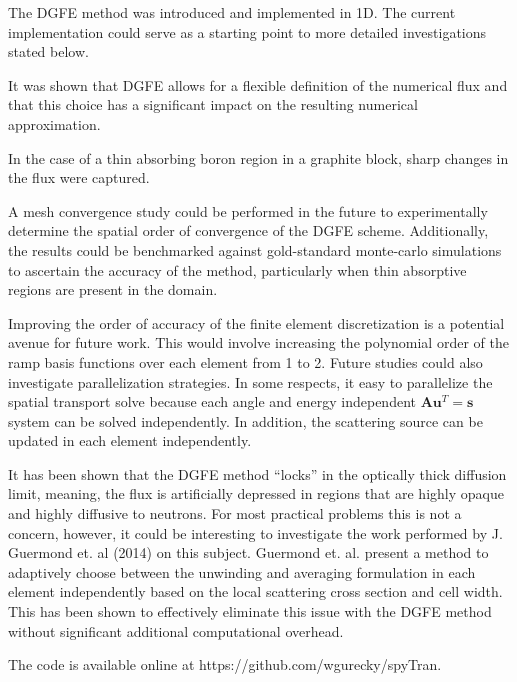
The DGFE method was introduced and implemented in 1D.   The current implementation could serve as a starting point to more detailed investigations stated below.

It was shown that DGFE allows for a flexible definition of the numerical flux and that this choice has a significant impact on the resulting numerical approximation.

In the case of a thin absorbing boron region in a graphite block, sharp changes in the flux were captured.

A mesh convergence study could be performed in the future to experimentally determine the spatial order of convergence of the DGFE scheme.  Additionally, the results could be benchmarked against gold-standard monte-carlo simulations to ascertain the accuracy of the method, particularly when thin absorptive regions are present in the domain.

Improving the order of accuracy of the finite element discretization is a potential avenue for future work. This would involve increasing the polynomial order of the ramp basis functions over each element from 1 to 2. Future studies could also investigate parallelization strategies. In some respects, it easy to parallelize the spatial transport solve because each angle and energy independent $\mathbf A \mathbf u^T = \mathbf s$ system can be solved independently. In addition, the scattering source can be updated in each element independently.

It has been shown that the DGFE method ``locks'' in the optically thick diffusion limit, meaning, the flux is artificially depressed in regions that are highly opaque and highly diffusive to neutrons.  For most practical problems this is not a concern, however, it could be interesting to investigate the work performed by J. Guermond et. al (2014) \cite{Guermond2014} on this subject.  Guermond et. al. present a method to adaptively choose between the unwinding and averaging formulation in each element independently based on the local scattering cross section and cell width.  This has been shown to effectively eliminate this issue with the DGFE method without significant additional computational overhead.

The code is available online at https://github.com/wgurecky/spyTran.